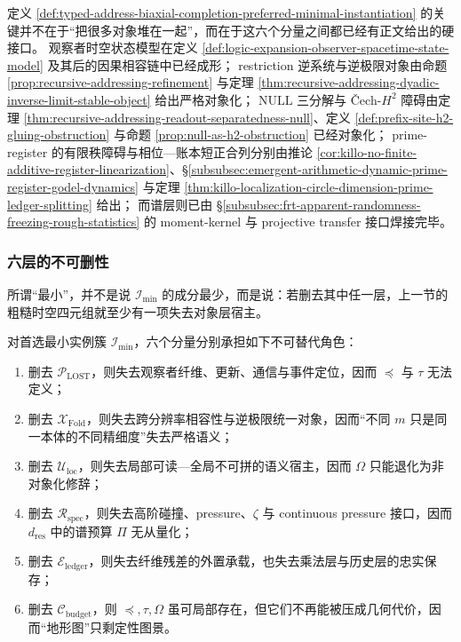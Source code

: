 定义 \ref{def:typed-address-biaxial-completion-preferred-minimal-instantiation} 的关键并不在于“把很多对象堆在一起”，而在于这六个分量之间都已经有正文给出的硬接口。
观察者时空状态模型在定义 \ref{def:logic-expansion-observer-spacetime-state-model} 及其后的因果相容链中已经成形；
restriction 逆系统与逆极限对象由命题 \ref{prop:recursive-addressing-refinement} 与定理 \ref{thm:recursive-addressing-dyadic-inverse-limit-stable-object} 给出严格对象化；
\(\mathrm{NULL}\) 三分解与 Čech-\(H^2\) 障碍由定理 \ref{thm:recursive-addressing-readout-separatedness-null}、定义 \ref{def:prefix-site-h2-gluing-obstruction} 与命题 \ref{prop:null-as-h2-obstruction} 已经对象化；
prime-register 的有限秩障碍与相位—账本短正合列分别由推论 \ref{cor:killo-no-finite-additive-register-linearization}、\S\ref{subsubsec:emergent-arithmetic-dynamic-prime-register-godel-dynamics} 与定理 \ref{thm:killo-localization-circle-dimension-prime-ledger-splitting} 给出；
而谱层则已由 \S\ref{subsubsec:frt-apparent-randomness-freezing-rough-statistics} 的 moment-kernel 与 projective transfer 接口焊接完毕。

\subsubsection{六层的不可删性}\label{subsubsec:typed-address-biaxial-completion-preferred-minimal-instantiation-minimality}
所谓“最小”，并不是说 \(\mathcal I_{\min}\) 的成分最少，而是说：若删去其中任一层，上一节的粗糙时空四元组就至少有一项失去对象层宿主。

\begin{proposition}[六层的不可删性]\label{prop:typed-address-biaxial-completion-preferred-minimal-instantiation-irreducible}
对首选最小实例簇 \(\mathcal I_{\min}\)，六个分量分别承担如下不可替代角色：
\begin{enumerate}
  \item 删去 \(\mathcal P_{\mathrm{LOST}}\)，则失去观察者纤维、更新、通信与事件定位，因而 \(\preceq\) 与 \(\tau\) 无法定义；
  \item 删去 \(\mathcal X_{\mathrm{Fold}}\)，则失去跨分辨率相容性与逆极限统一对象，因而“不同 \(m\) 只是同一本体的不同精细度”失去严格语义；
  \item 删去 \(\mathcal U_{\mathrm{loc}}\)，则失去局部可读—全局不可拼的语义宿主，因而 \(\Omega\) 只能退化为非对象化修辞；
  \item 删去 \(\mathcal R_{\mathrm{spec}}\)，则失去高阶碰撞、pressure、\(\zeta\) 与 continuous pressure 接口，因而 \(d_{\mathrm{res}}\) 中的谱预算 \(\Pi\) 无从量化；
  \item 删去 \(\mathcal E_{\mathrm{ledger}}\)，则失去纤维残差的外置承载，也失去乘法层与历史层的忠实保存；
  \item 删去 \(\mathcal C_{\mathrm{budget}}\)，则 \(\preceq,\tau,\Omega\) 虽可局部存在，但它们不再能被压成几何代价，因而“地形图”只剩定性图景。
\end{enumerate}
\end{proposition}

